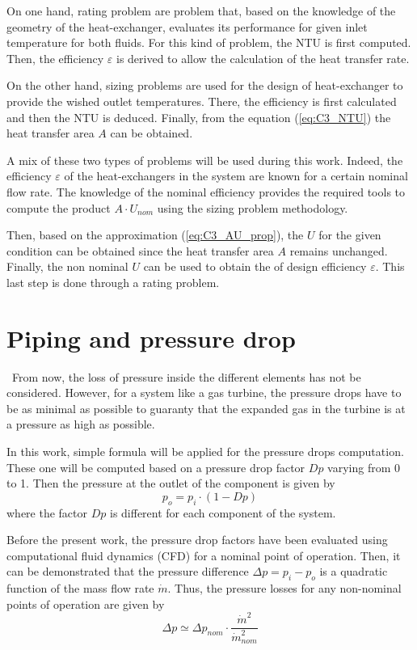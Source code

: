 On one hand, rating problem are problem that, based on the knowledge of the geometry of the heat-exchanger, evaluates its performance for given inlet temperature for both fluids. For this kind of problem, the NTU is first computed. Then, the efficiency \(\varepsilon\) is derived to allow the calculation of the heat transfer rate.

On the other hand, sizing problems are used for the design of heat-exchanger to provide the wished outlet temperatures. There, the efficiency is first calculated and then the NTU is deduced. Finally, from the equation (\ref{eq:C3_NTU}) the heat transfer area \(A\) can be obtained\cite{Ngendakumana2018}.

A mix of these two types of problems will be used during this work. Indeed, the efficiency \(\varepsilon\) of the heat-exchangers in the system are known for a certain nominal flow rate.    The knowledge of the nominal efficiency provides the required tools to compute the product \(A\cdot U_{nom}\) using the sizing problem methodology.

Then, based on the approximation (\ref{eq:C3_AU_prop}), the \(U\) for the given condition can be obtained since the heat transfer area \(A\) remains unchanged. Finally, the non nominal \(U\) can be used to obtain the of design efficiency \(\varepsilon\). This last step is done through a rating problem.
\newpage
\section{Piping and pressure drop}
\quad\ From now, the loss of pressure inside the different elements has not be considered. However, for a system like a gas turbine, the pressure drops have to be as minimal as possible to guaranty that the expanded gas in the turbine is at a pressure as high as possible.

In this work, simple formula will be applied for the pressure drops computation. These one will be computed based on a pressure drop factor \(Dp\) varying from 0 to 1. Then the pressure at the outlet of the component is given by
\begin{equation}
    p_{o} = p_{i}\cdot (1 - Dp)
\end{equation}
where the factor \(Dp\) is different for each component of the system.

Before the present work, the pressure drop factors have been evaluated using computational fluid dynamics (CFD) for a nominal point of operation. Then, it can be demonstrated that the pressure difference \(\Delta p = p_{i} - p_{o}\) is a quadratic function of the mass flow rate \(\dot{m}\). Thus, the pressure losses for any non-nominal points of operation are given by
\begin{equation}
    \Delta p \simeq \Delta p_{nom}\cdot \frac{\dot{m}^2}{\dot{m}^2_{nom}}
\end{equation}
